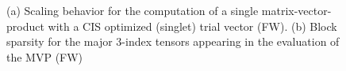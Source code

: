 \begin{figure}
\caption[Scaling behavior of CDD-DF-SOS-ADC(2) for FW]{(a) Scaling behavior for the computation of a single matrix-vector-product with a CIS optimized (singlet) trial vector (FW). (b) Block sparsity for the major 3-index tensors appearing in the evaluation of the MVP (FW)}

\end{figure}